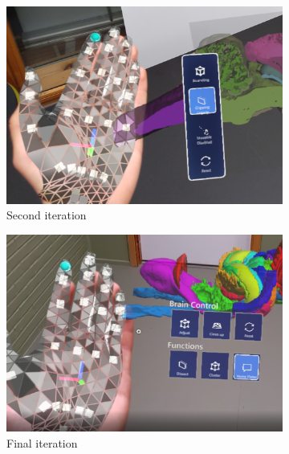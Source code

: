 \begin{figure}[h]
\begin{subfigure}[b]{0.5\textwidth}
    \includegraphics[width=\textwidth]{fig/handmenuiter2.png}
    \caption{Second iteration}
    \label{fig:hanmenuiter2}
\end{subfigure}
\begin{subfigure}[b]{0.5\textwidth}
    \includegraphics[width=\textwidth]{fig/handmenuiter3.png}
    \caption{Final iteration}
    \label{fig:hanmenuiter3}
\end{subfigure}
\caption{}

\end{figure}

